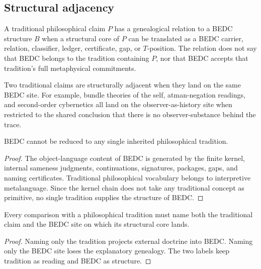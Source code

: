 \subsection{Structural adjacency}
\label{subsec:philosophy-structural-adjacency}

\begin{definition}
\label{def:philosophy-philosophical-genealogy}
A traditional philosophical claim \(P\) has a genealogical relation to
a BEDC structure \(B\) when a structural core of \(P\) can be translated
as a BEDC carrier, relation, classifier, ledger, certificate, gap, or
\(T\)-position. The relation does not say that BEDC belongs to the
tradition containing \(P\), nor that BEDC accepts that tradition's full
metaphysical commitments.
\end{definition}

\begin{definition}
\label{def:philosophy-structural-adjacency}
Two traditional claims are structurally adjacent when they land on the
same BEDC site. For example, bundle theories of the self,
atman-negation readings, and second-order cybernetics all land on the
observer-as-history site when restricted to the shared conclusion that
there is no observer-substance behind the trace.
\end{definition}


\begin{theorem}
\label{thm:philosophy-bedc-not-one-tradition}
BEDC cannot be reduced to any single inherited philosophical
tradition.
\end{theorem}
\begin{proof}
The object-language content of BEDC is generated by the finite kernel,
internal sameness judgments, continuations, signatures, packages, gaps,
and naming certificates. Traditional philosophical vocabulary belongs
to interpretive metalanguage. Since the kernel chain does not take any
traditional concept as primitive, no single tradition supplies the
structure of BEDC.
\end{proof}

\begin{corollary}
\label{cor:philosophy-comparisons-two-labels}
Every comparison with a philosophical tradition must name both the
traditional claim and the BEDC site on which its structural core lands.
\end{corollary}
\begin{proof}
Naming only the tradition projects external doctrine into BEDC. Naming
only the BEDC site loses the explanatory genealogy. The two labels keep
tradition as reading and BEDC as structure.
\end{proof}


